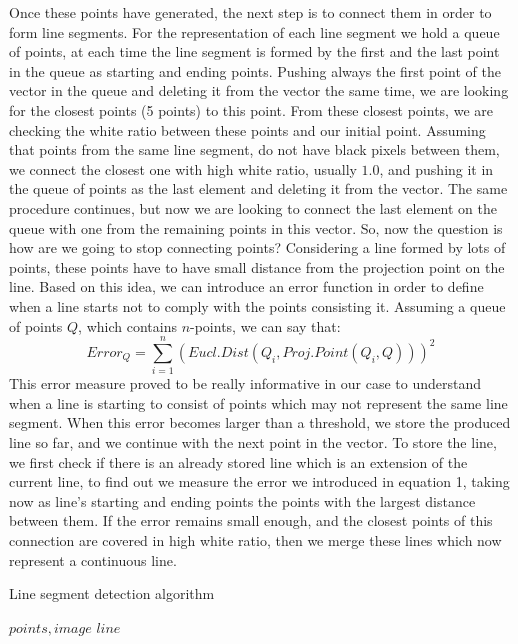\documentclass[	DIV=calc,%
							paper=a4,%
							fontsize=9pt,%
							twocolumn]{scrartcl}	 					%
\begin{document}
Once these points have generated, the next step is to connect them in order to form line segments. For the representation of each line segment we hold a queue of points, at each time the line segment is formed by the first and the last point in the queue as starting and ending points. Pushing always the first point of the vector in the queue and deleting it from the vector the same time, we are looking for the closest points (5 points) to this point. From these closest points, we are checking the white ratio between these points and our initial point. Assuming that points from the same line segment, do not have black pixels between them, we connect the closest one with high white ratio, usually $1.0$, and pushing it in the queue of points as the last element and deleting it from the vector. The same procedure continues, but now we are looking to connect the last element on the queue with one from the remaining points in this vector. So, now the question is how are we going to stop connecting points? Considering a line formed by lots of points, these points have to have small distance from the projection point on the line. Based on this idea, we can introduce an error function in order to define when a line starts not to comply with the points consisting it. Assuming a queue of points $Q$, which contains $n$-points, we can say that:
\begin{equation}
Error_Q = \sum_{i=1}^{n}(Eucl.Dist(Q_i, Proj.Point(Q_i,Q)))^2
\end{equation}
This error measure proved to be really informative in our case to understand when a line is starting to consist of points which may not represent the same line segment. When this error becomes larger than a threshold, we store the produced line so far, and we continue with the next point in the vector. To store the line, we first check if there is an already stored line which is an extension of the current line, to find out we measure the error we introduced in equation 1, taking now as line's starting and ending points the points with the largest distance between them. If the error remains small enough, and the closest points of this connection are covered in high white ratio, then we merge these lines which now represent a continuous line.
\begin{algorithm}[t!]
\caption{Line segment detection algorithm}
\label{line}
\begin{algorithmic}[1]
$points, image$
$line$
\ELSE
{}
\ENDIF
\ENDWHILE
\end{algorithmic}
\end{algorithm}
\end{document}
